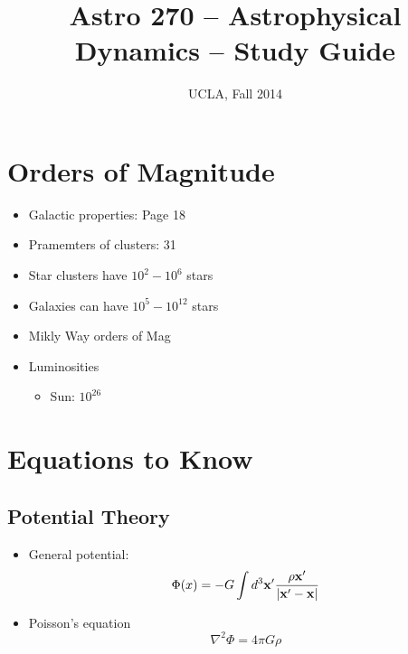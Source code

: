 


\title{Astro 270 -- Astrophysical Dynamics -- Study Guide}
\author{UCLA, Fall 2014}


\setlength{\unitlength}{1mm}
\maketitle


\tableofcontents



\section{Orders of Magnitude}
\begin{itemize}
\item Galactic properties: Page 18
\item Pramemters of clusters: 31
\end{itemize}
\begin{itemize}
\item Star clusters have $10^2 - 10^6$ stars
\item Galaxies can have $10^5 - 10^{12}$ stars
\item Mikly Way orders of Mag
\item Luminosities
\begin{itemize}
\item Sun: $10^{26}$
\end{itemize}
\end{itemize}


\section{Equations to Know}
\subsection{Potential Theory}

\begin{itemize}
\item General potential:
\begin{equation}
\Phi(x) = -G\int d^3\mathbf{x'} \frac{\rho{\ensuremath{\mathbf{x}}'}}{|\mathbf{x}' - \mathbf{x}|}
\end{equation}
\item Poisson's equation
\begin{equation}
\nabla^2 \Phi = 4\pi G \rho
\end{equation}
\end{itemize}



